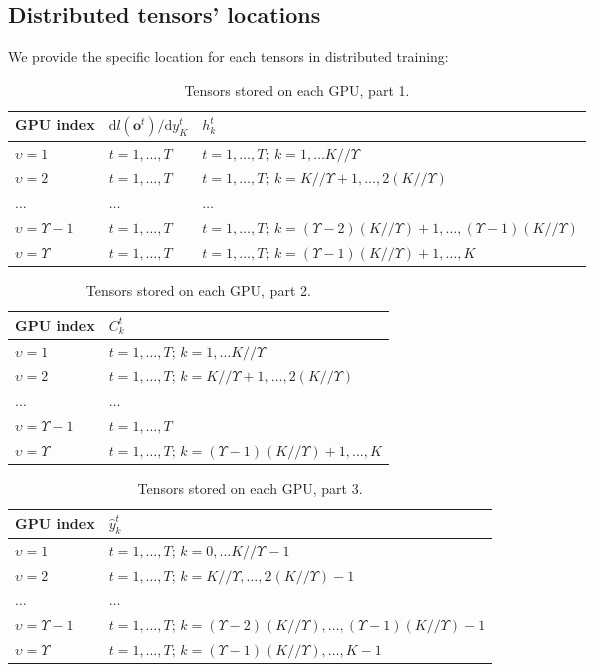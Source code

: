 \documentclass{article}
\newcommand{\diff}{\mathrm{d}}
\begin{document}
\subsection{Distributed tensors' locations}
\label{sec:dist}
We provide the specific location for each tensors in distributed training:
\begin{table}[hbt!]
\caption{Tensors stored on each GPU, part 1.}
\begin{tabular}{l|ll}
GPU index             & $\diff l(\mathbf{o}^t)/\diff y_K^t$ & $h_k^t$  \\ \midrule
$\upsilon=1$          & $t=1,\dots,T$              & $t=1,\dots,T;\, k=1,\dots K//\Upsilon$ \\
$\upsilon=2$          & $t=1,\dots,T$              & $t=1,\dots,T;\, k=K//\Upsilon+1,\dots,2(K//\Upsilon)$ \\
$\dots$               & $\dots$                    & $\dots$ \\
$\upsilon=\Upsilon-1$ & $t=1,\dots,T$              & $t=1,\dots,T;\, k=(\Upsilon-2)(K//\Upsilon)+1,\dots,(\Upsilon-1)(K//\Upsilon)$ \\
$\upsilon=\Upsilon$   & $t=1,\dots,T$              & $t=1,\dots,T;\, k=(\Upsilon-1)(K//\Upsilon)+1,\dots,K$ 
\end{tabular}
\label{tab:dist1}
\end{table}

\begin{table}[hbt!]
\caption{Tensors stored on each GPU, part 2.}
\begin{tabular}{l|l}
GPU index             & $C_k^t$ \\ \midrule
$\upsilon=1$          & $t=1,\dots,T;\, k=1,\dots K//\Upsilon$ \\
$\upsilon=2$ & $t=1,\dots,T;\, k=K//\Upsilon+1,\dots,2(K//\Upsilon)$ \\
$\dots$ & $\dots$ \\
$\upsilon=\Upsilon-1$ & $t=1,\dots,T$ \\
$\upsilon=\Upsilon$   & $t=1,\dots,T;\, k=(\Upsilon-1)(K//\Upsilon)+1,\dots,K$
\end{tabular}
\label{tab:dist2}
\end{table}

\begin{table}[hbt!]
\caption{Tensors stored on each GPU, part 3.}
\begin{tabular}{l|l}
GPU index & $\hat{y}_k^t$  \\ \midrule
$\upsilon=1$ & $t=1,\dots,T;\, k=0,\dots K//\Upsilon-1$ \\
$\upsilon=2$ & $t=1,\dots,T;\, k=K//\Upsilon,\dots,2(K//\Upsilon)-1$ \\
$\dots$ & $\dots$ \\
$\upsilon=\Upsilon-1$ & $t=1,\dots,T;\, k=(\Upsilon-2)(K//\Upsilon),\dots,(\Upsilon-1)(K//\Upsilon)-1$ \\
$\upsilon=\Upsilon$   & $t=1,\dots,T;\, k=(\Upsilon-1)(K//\Upsilon),\dots,K-1$
\end{tabular}
\label{tab:dist3}
\end{table}
\end{document}
